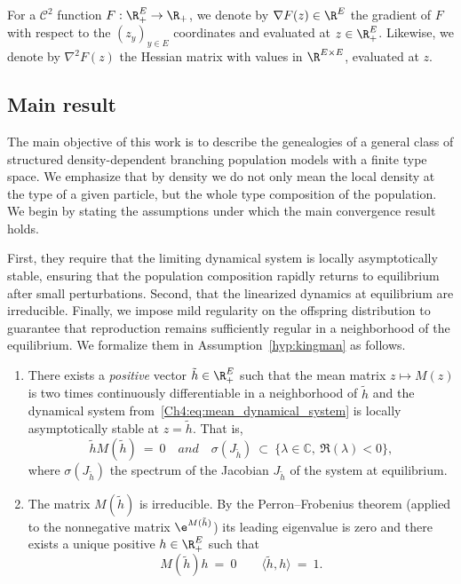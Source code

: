 \begin{refsegment}
For a $\mathcal C^2$ function $F:\R_+^E\to \R_+$, we denote by $\nabla F(z)\in \R^E$ the gradient of $F$ with respect to the $(z_y)_{y\in E}$ coordinates and evaluated at $z\in\R_+^E$. Likewise, we denote by $\nabla^2 F(z)$ the Hessian matrix with values in $\R^{E\times E}$, evaluated at $z$.
\subsection{Main result}\label{Ch4:sec:results}

The main objective of this work is to describe the genealogies of a general class of structured density-dependent branching population models with a finite type space. We emphasize that by density we do not only mean the local density at the type of a given particle, but the whole type composition of the population. 
We begin by stating the assumptions under which the main convergence result holds. 

First, they require that the limiting dynamical system is locally asymptotically stable, ensuring that the population composition rapidly returns to equilibrium after small perturbations. Second, that the linearized dynamics at equilibrium are irreducible. Finally, we impose mild regularity on the offspring distribution to guarantee that reproduction remains sufficiently regular in a neighborhood of the equilibrium. 
We formalize them in Assumption~\ref{hyp:kingman} as follows.

\begin{assumption}\label{hyp:kingman}\hfill
  \begin{enumerate}
  \item There exists a \emph{positive} vector $\tilde{h}\in \R^E_+$ such that the mean matrix $z\mapsto M(z)$ is two times continuously differentiable in a neighborhood of $\tilde{h}$ and the dynamical system from~\eqref{Ch4:eq:mean_dynamical_system} is locally asymptotically stable at $z=\tilde{h}$. That is,
\begin{equation}\label{hyp:stability}\tag{A.1}
\tilde{h}M(\tilde h)\ =\ 0\quad\textit{and}\quad \sigma(J_{\tilde h})\ \subset\ \big\{\lambda\in \mathbb{C},\ \Re(\lambda)<0\big\},
\end{equation}
where $\sigma(J_{\tilde h})$ the spectrum of the Jacobian $J_{\tilde h}$ of the system at equilibrium.

\item The matrix $M(\tilde{h})$ is irreducible. By the Perron--Frobenius theorem (applied to the nonnegative matrix $\e^{M(\tilde{h})}$)  its leading eigenvalue is zero and there exists a unique positive $h\in\R_+^E$ such that
\begin{equation}\label{hyp:PF}\tag{A.2}
 M(\tilde h)h\ =\ 0\qquad \langle \tilde h, h\rangle\ =\ 1.
\end{equation}


\end{enumerate}
\end{assumption}
\end{refsegment}
